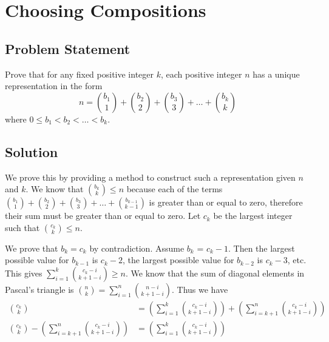 \documentclass[12pt]{article}
\newcommand{\ProblemStatement}[1]{
\subsection*{Problem Statement}
#1
\subsection*{Solution}
}
\begin{document}
\section{Choosing Compositions}
\ProblemStatement{
Prove that for any fixed positive integer $k$, each positive integer $n$ has a unique representation in the form 
\[
    n = \binom{b_1}{1} + \binom{b_2}{2} + \binom{b_3}{3} +\dots + \binom{b_k}{k} 
\]
where $0 \le b_1 < b_2 < \dots < b_k$.
}

We prove this by providing a method to construct such a representation given $n$ and $k$.
We know that $\binom{b_k}{k} \le n$ because each of the terms $\binom{b_1}{1} + \binom{b_2}{2} + \binom{b_3}{3} +\dots + \binom{b_{k-1}}{k-1}$ is greater than or equal to zero, therefore their sum must be greater than or equal to zero. Let $c_k$ be the largest integer such that $\binom{c_k}{k} \le n$. 

We prove that $b_k = c_k$ by contradiction. Assume $b_k$ = $c_k - 1$. Then the largest possible value for $b_{k-1}$ is $c_k-2$, the largest possible value for $b_{k-2}$ is $c_k-3$, etc. This gives $\sum_{i=1}^{k} \binom{c_k-i}{k+1-i} \ge n$. We know that the sum of diagonal elements in Pascal's triangle is $\binom{n}{k} = \sum_{i=1}^{n} \binom{n-i}{k+1-i}$. Thus we have
\begin{align*}
    \binom{c_k}{k} &= \left(\sum_{i=1}^{k} \binom{c_k-i}{k+1-i}\right)+\left(\sum_{i=k+1}^{n} \binom{c_k-i}{k+1-i}\right)\\
    \binom{c_k}{k} - \left(\sum_{i=k+1}^{n} \binom{c_k-i}{k+1-i}\right)&= \left(\sum_{i=1}^{k} \binom{c_k-i}{k+1-i}\right)
\end{align*}
\end{document}
